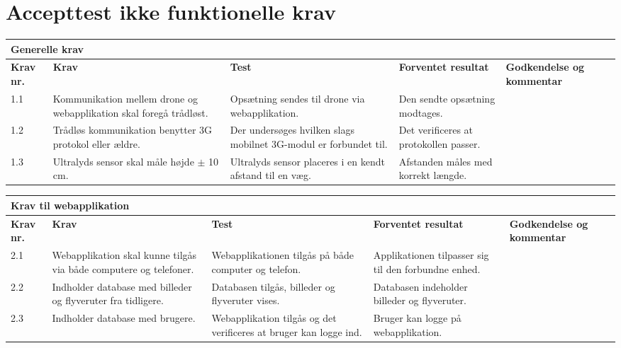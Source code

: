 \section{Accepttest ikke funktionelle krav}

\begin{sideways}
    \centering
    \begin{tabular}{|l|p{4.5 cm}|p{4.5 cm}|p{4.5 cm}|p{4.5 cm}|p{2 cm}|}
			\hline
			\multicolumn{5}{|l|}{\textbf{Generelle krav}}\\ \hline
			\textbf{Krav nr.} & \textbf{Krav} & \textbf{Test} & \textbf{Forventet \newline resultat} & 			
			\textbf{Godkendelse \newline og kommentar} \\ \hline
			
			1.1 & Kommunikation mellem drone og webapplikation skal foregå trådløst.
				& Opsætning sendes til drone via webapplikation.
				& Den sendte opsætning modtages.
				& \\ \hline

			1.2 & Trådløs kommunikation benytter 3G protokol eller ældre. 
				& Der undersøges hvilken slags mobilnet 3G-modul er forbundet til.
				& Det verificeres at protokollen passer.
				&  \\ \hline
			
			1.3 & Ultralyds sensor skal måle højde $\pm$ 10 cm.
				& Ultralyds sensor placeres i en kendt afstand til en væg.
				& Afstanden måles med korrekt længde.
				& \\ \hline						
		\end{tabular}
\end{sideways}

\begin{sideways}
    \centering
    \begin{tabular}{|l|p{4.5 cm}|p{4.5 cm}|p{4.5 cm}|p{4.5 cm}|p{2 cm}|}
			\hline
			\multicolumn{5}{|l|}{\textbf{Krav til webapplikation}}\\ \hline
			\textbf{Krav nr.} & \textbf{Krav} & \textbf{Test} & \textbf{Forventet \newline resultat} & 			
			\textbf{Godkendelse \newline og kommentar} \\ \hline
			
			2.1 & Webapplikation skal kunne tilgås via både computere og telefoner.
				& Webapplikationen tilgås på både computer og telefon.
				& Applikationen tilpasser sig til den forbundne enhed.
				& \\ \hline

			2.2 & Indholder database med billeder og flyveruter fra tidligere. 
				& Databasen tilgås, billeder og flyveruter vises.
				& Databasen indeholder billeder og flyveruter.
				&  \\ \hline
			
			2.3 & Indholder database med brugere.
				& Webapplikation tilgås og det verificeres at bruger kan logge ind.
				& Bruger kan logge på webapplikation.
				& \\ \hline				
		\end{tabular}
	\label{tab:krav_1}
\end{sideways}

